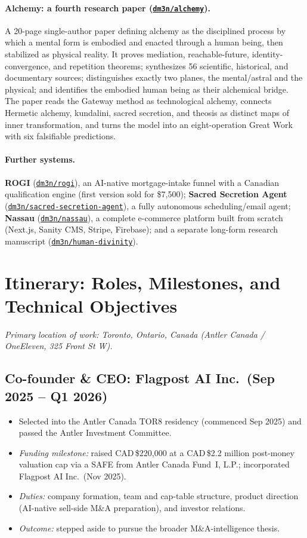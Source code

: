 \documentclass[11pt]{article}
\theoremstyle{plain}
\theoremstyle{definition}
\newcommand{\repo}[1]{\href{https://github.com/dm3n/#1}{\nolinkurl{dm3n/#1}}}
\begin{document}
\paragraph{Alchemy: a fourth research paper (\repo{alchemy}).} A 20-page single-author
paper defining alchemy as the disciplined process by which a mental form is embodied
and enacted through a human being, then stabilized as physical reality. It proves mediation, reachable-future,
identity-convergence, and repetition theorems; synthesizes 56 scientific, historical,
and documentary sources; distinguishes exactly two planes, the mental/astral and the
physical; and identifies the embodied human being as their alchemical bridge.
The paper reads the Gateway method as technological alchemy, connects Hermetic alchemy,
kundalini, sacred secretion, and theosis as distinct maps of inner transformation, and
turns the model into an eight-operation Great Work with six falsifiable predictions.

\paragraph{Further systems.} \textbf{ROGI} (\repo{rogi}), an AI-native mortgage-intake
funnel with a Canadian qualification engine (first version sold for \$7{,}500);
\textbf{Sacred Secretion Agent} (\repo{sacred-secretion-agent}), a fully autonomous
scheduling/email agent; \textbf{Nassau} (\repo{nassau}), a complete e-commerce platform
built from scratch (Next.js, Sanity CMS, Stripe, Firebase); and a separate long-form
research manuscript (\repo{human-divinity}).

\section{Itinerary: Roles, Milestones, and Technical Objectives}
\noindent\emph{Primary location of work: Toronto, Ontario, Canada (Antler Canada / OneEleven,
325 Front St W).}

\subsection{Co-founder \& CEO: Flagpost AI Inc.\ (Sep 2025 -- Q1 2026)}
\begin{itemize}
  \item Selected into the Antler Canada TOR8 residency (commenced Sep 2025) and passed the
  Antler Investment Committee.
  \item \textit{Funding milestone:} raised CAD\,\$220{,}000 at a CAD\,\$2.2 million post-money valuation cap via a SAFE from
  Antler Canada Fund~I, L.P.; incorporated Flagpost AI Inc.\ (Nov 2025).
  \item \textit{Duties:} company formation, team and cap-table structure, product direction
  (AI-native sell-side M\&A preparation), and investor relations.
  \item \textit{Outcome:} stepped aside to pursue the broader M\&A-intelligence thesis.
\end{itemize}
\end{document}
